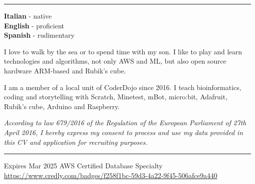 \documentclass[9pt]{stackoverflow-upgraded-version} %
\begin{document}

\textcolor{stackoverflow}{\hrule}
\vspace{\baselineskip} %
\begin{minipage}[t]{0.2\textwidth}

	\textbf{Italian} - native\\
	\textbf{English} - proficient\\
	\textbf{Spanish} - rudimentary
\end{minipage}
\hfill
\begin{minipage}[t]{0.35\textwidth}

	I love to walk by the sea or to spend time with my son.
	I like to play and learn technologies and algorithms, not only AWS and ML,
	but also open source hardware ARM-based and Rubik's cube.
\end{minipage}
\hfill
\begin{minipage}[t]{0.35\textwidth}

	I am a member of a local unit of CoderDojo since 2016.
	I teach bioinformatics, coding and storytelling with
	Scratch, Minetest, mBot, micro:bit, Adafruit, Rubik's cube, Arduino and Raspberry.\\
\end{minipage}

\emph{\scriptsize According to law 679/2016 of the Regulation of the European Parliament of 27th April 2016, I hereby express my consent to process
and use my data provided in this CV and application for recruiting purposes.}

\newpage

\textcolor{stackoverflow}{\hrule}
\vspace{\baselineskip} %
\begin{entrylist}
	\entry
		{Expires Mar 2025}
		{AWS Certified Database}
		{Specialty}
		{\href{https://www.credly.com/badges/f258f1bc-59d3-4a22-9f45-506afce9a440}{https://www.credly.com/badges/f258f1bc-59d3-4a22-9f45-506afce9a440}}
\end{entrylist}
\end{document}
